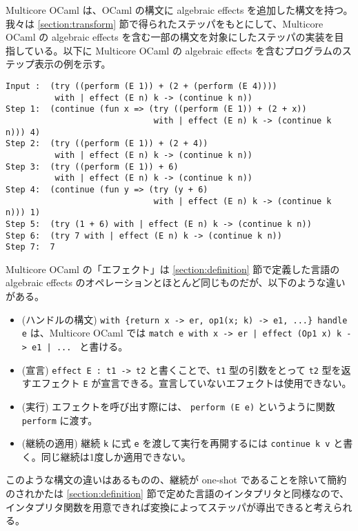 Multicore OCaml は、OCaml の構文に algebraic effects を追加した構文を持つ。我々は \ref{section:transform} 節で得られたステッパをもとにして、Multicore OCaml の algebraic effects を含む一部の構文を対象にしたステッパの実装を目指している。以下に Multicore OCaml の algebraic effects を含むプログラムのステップ表示の例を示す。

\begin{verbatim}
Input :  (try ((perform (E 1)) + (2 + (perform (E 4))))
          with | effect (E n) k -> (continue k n))
Step 1:  (continue (fun x => (try ((perform (E 1)) + (2 + x))
                              with | effect (E n) k -> (continue k n))) 4)
Step 2:  (try ((perform (E 1)) + (2 + 4))
          with | effect (E n) k -> (continue k n))
Step 3:  (try ((perform (E 1)) + 6)
          with | effect (E n) k -> (continue k n))
Step 4:  (continue (fun y => (try (y + 6)
                              with | effect (E n) k -> (continue k n))) 1)
Step 5:  (try (1 + 6) with | effect (E n) k -> (continue k n))
Step 6:  (try 7 with | effect (E n) k -> (continue k n))
Step 7:  7
\end{verbatim}

Multicore OCaml の「エフェクト」は \ref{section:definition} 節で定義した言語の algebraic effects のオペレーションとほとんど同じものだが、以下のような違いがある。

\begin{itemize}
\item (ハンドルの構文) \texttt{with \{return x -> er, op1(x; k) -> e1, ...\} handle e} は、Multicore OCaml では \texttt{match e with x -> er | effect (Op1 x) k -> e1 | ...\ } と書ける。
\item (宣言) \texttt{effect E : t1 -> t2} と書くことで、\texttt{t1} 型の引数をとって \texttt{t2} 型を返すエフェクト \texttt{E} が宣言できる。宣言していないエフェクトは使用できない。
\item (実行) エフェクトを呼び出す際には、 \texttt{perform (E e)} というように関数 \texttt{perform} に渡す。
\item (継続の適用) 継続 \texttt{k} に式 \texttt{e} を渡して実行を再開するには \texttt{continue k v} と書く。同じ継続は1度しか適用できない。
\end{itemize}

このような構文の違いはあるものの、継続が one-shot であることを除いて簡約のされかたは \ref{section:definition} 節で定めた言語のインタプリタと同様なので、インタプリタ関数を用意できれば変換によってステッパが導出できると考えられる。
